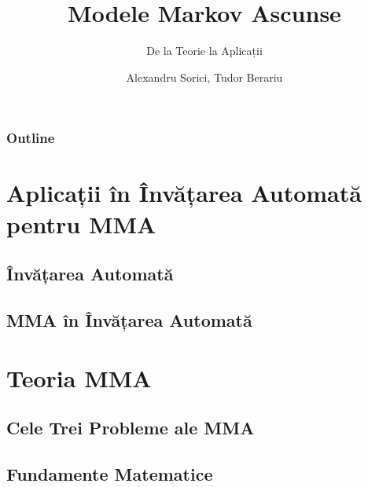 \documentclass{beamer}
\title[ARIA]{Modele Markov Ascunse}
\subtitle{De la Teorie la Aplicații}
\author[A. Sorici, T. Berariu]{Alexandru Sorici, Tudor Berariu}
\institute[AI-MAS]{Asociația Română pentru Inteligență Artificială}
\begin{document}
\maketitle

\abovedisplayskip=8pt
\belowdisplayskip=8pt
\abovedisplayshortskip=2pt
\belowdisplayshortskip=2pt


\begin{frame}
  \tableofcontents[onlyparts]
\end{frame}

\begin{frame}
  \frametitle{Outline}
  \tableofcontents[pausesections]
\end{frame}

\section{Aplicații în Învățarea Automată pentru MMA}
\label{sec:intro-to-hmm}

\subsection{Învățarea Automată}
\label{sec:machine-learning}



\subsection{MMA în Învățarea Automată}
\label{sec:hmm-in-ml}



\section{Teoria MMA}
\label{sec:theory}

\subsection{Cele Trei Probleme ale MMA}
\label{sec:three-problmes}



\subsection{Fundamente Matematice}
\label{sec:math-foundations}


\end{document}

